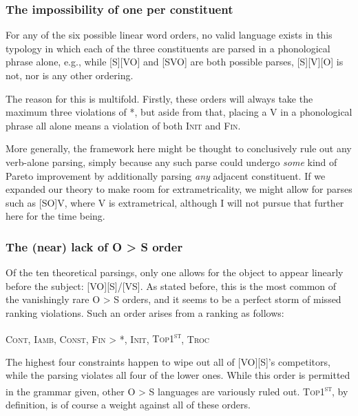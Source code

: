 \documentclass{article}
\newcommand{\cont}{\textsc{Cont}}
\newcommand{\iamb}{\textsc{Iamb}}
\newcommand{\cons}{\textsc{Const}}
\newcommand{\topf}{\textsc{Top1\textsuperscript{st}}}
\newcommand{\nophi}{\textsc{*\textphi}}
\newcommand{\finphi}{\textsc{Fin\textphi}}
\newcommand{\initphi}{\textsc{Init\textphi}}
\newcommand{\troc}{\textsc{Troc}}
\begin{document}
\subsubsection{The impossibility of one {\textphi} per constituent}

For any of the six possible linear word orders, no valid language exists in this typology in which each of the three constituents are parsed in a phonological phrase alone, e.g., while [S][VO] and [SVO] are both possible parses, [S][V][O] is not, nor is any other ordering.

The reason for this is multifold.
Firstly, these orders will always take the maximum three violations of {\nophi}, but aside from that, placing a V in a phonological phrase all alone means a violation of both {\initphi} and {\finphi}.

More generally, the framework here might be thought to conclusively rule out any verb-alone parsing, simply because any such parse could undergo \emph{some} kind of Pareto improvement by additionally parsing \emph{any} adjacent constituent.
If we expanded our theory to make room for extrametricality, we might allow for parses such as [SO]V, where V is extrametrical, although I will not pursue that further here for the time being.

\subsubsection{The (near) lack of O {\textgreater} S order}

Of the ten theoretical parsings, only one allows for the object to appear linearly before the subject: [VO][S]/[VS].
As stated before, this is the most common of the vanishingly rare O {\textgreater} S orders, and it seems to be a perfect storm of missed ranking violations.
Such an order arises from a ranking as follows:

\begin{center}
\cont, \iamb, \cons, {\finphi} {\textgreater} \nophi, \initphi, \topf, \troc
\end{center}

The highest four constraints happen to wipe out all of [VO][S]'s competitors, while the parsing violates all four of the lower ones.
While this order is permitted in the grammar given, other O {\textgreater} S languages are variously ruled out.
{\topf}, by definition, is of course a weight against all of these orders.
\end{document}
